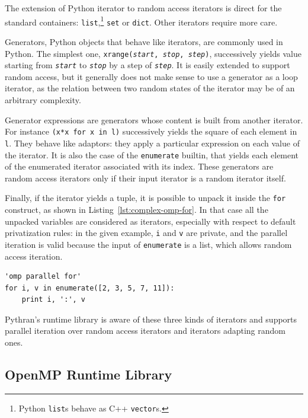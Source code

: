 \documentclass[conference]{IEEEtran}
\begin{document}
The extension of Python iterator to random access iterators is direct for the
standard containers: \texttt{list},\footnote{Python \texttt{list}s behave as C++
\texttt{vector}s.} \texttt{set} or \texttt{dict}. Other iterators require more
care.

Generators, Python objects that behave like iterators, are commonly used in
Python. The simplest one, \texttt{xrange(\emph{start}, \emph{stop},
\emph{step})}, successively yields value starting from \texttt{\emph{start}} to
\texttt{\emph{stop}} by a step of \texttt{\emph{step}}. It is easily extended to
support random access, but it generally does not make sense to use a generator
as a loop iterator, as the relation between two random states of the iterator
may be of an arbitrary complexity.

Generator expressions are generators whose content is built from another
iterator. For instance \texttt{(x*x for x in l)} successively yields the square
of each element in \texttt{l}. They behave like adaptors: they apply a
particular expression on each value of the iterator. It is also the case of the
\texttt{enumerate} builtin, that yields each element of the enumerated iterator
associated with its index. These generators are random access iterators only if
their input iterator is a random iterator itself.

Finally, if the iterator yields a tuple, it is possible to unpack it inside the
\texttt{for} construct, as shown in Listing~\ref{lst:complex-omp-for}. In that
case all the unpacked variables are considered as iterators, especially with
respect to default privatization rules: in the given example, \texttt{i} and
\texttt{v} are private, and the parallel iteration is valid because the input of
\texttt{enumerate} is a list, which allows random access iteration.

\begin{lstlisting}[float, label={lst:complex-omp-for}, caption={Parallel
    loop in Pythran with tuple unpacking.}]
'omp parallel for'
for i, v in enumerate([2, 3, 5, 7, 11]):
    print i, ':', v
\end{lstlisting}

Pythran's runtime library is aware of these three kinds of iterators and
supports parallel iteration over random access iterators and iterators adapting
random ones.

\subsection{OpenMP Runtime Library}
\end{document}
